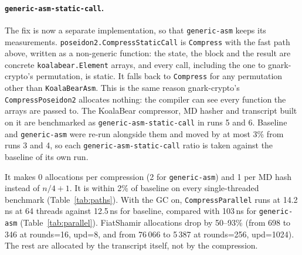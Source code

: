 \documentclass[10pt,a4paper]{article}
\begin{document}
\paragraph{\texttt{generic-asm-static-call}.} The fix is now a separate implementation, so that
\texttt{generic-asm} keeps its measurements. \texttt{poseidon2.CompressStaticCall} is
\texttt{Compress} with the fast path above, written as a non-generic function: the state,
the block and the result are concrete \texttt{koalabear.Element} arrays, and every call,
including the one to gnark-crypto's permutation, is static. It falls back to
\texttt{Compress} for any permutation other than \texttt{KoalaBearAsm}. This is the same
reason gnark-crypto's \texttt{CompressPoseidon2} allocates nothing: the compiler can see
every function the arrays are passed to. The KoalaBear compressor, MD hasher and
transcript built on it are benchmarked as \texttt{generic-asm-static-call} in runs 5 and 6.
Baseline and \texttt{generic-asm} were re-run alongside them and moved by at most 3\% from
runs 3 and 4, so each \texttt{generic-asm-static-call} ratio is taken against the baseline of
its own run.

It makes 0 allocations per compression (2 for \texttt{generic-asm}) and 1 per MD hash
instead of $n/4+1$. It is within 2\% of baseline on every single-threaded benchmark
(Table~\ref{tab:paths}). With the GC on, \texttt{CompressParallel} runs at 14.2\,ns at 64
threads against 12.5\,ns for baseline, compared with 103\,ns for \texttt{generic-asm}
(Table~\ref{tab:parallel}). FiatShamir allocations drop by 50--93\% (from 698 to 346 at rounds=16,
upd=8, and from 76\,066 to 5\,387 at rounds=256, upd=1024). The rest are allocated by the
transcript itself, not by the compression.
\end{document}
